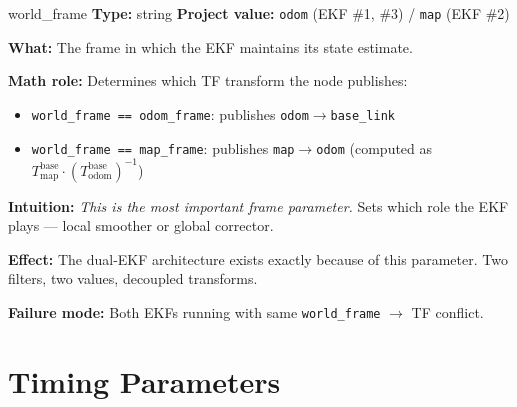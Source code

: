 \documentclass[11pt,a4paper]{article}
\begin{document}
\begin{paramcard}{world\_frame}
\textbf{Type:} string \quad \textbf{Project value:} \texttt{odom} (EKF \#1, \#3) / \texttt{map} (EKF \#2)

\textbf{What:} The frame in which the EKF maintains its state estimate.

\textbf{Math role:} Determines which TF transform the node publishes:
\begin{itemize}
\item \texttt{world\_frame == odom\_frame}: publishes \texttt{odom}$\to$\texttt{base\_link}
\item \texttt{world\_frame == map\_frame}: publishes \texttt{map}$\to$\texttt{odom} (computed as $T_{\text{map}}^{\text{base}} \cdot (T_{\text{odom}}^{\text{base}})^{-1}$)
\end{itemize}

\textbf{Intuition:} \emph{This is the most important frame parameter.} Sets which role the EKF plays --- local smoother or global corrector.

\textbf{Effect:} The dual-EKF architecture exists exactly because of this parameter. Two filters, two values, decoupled transforms.

\textbf{Failure mode:} Both EKFs running with same \texttt{world\_frame} $\to$ TF conflict.
\end{paramcard}

\section{Timing Parameters}
\end{document}
